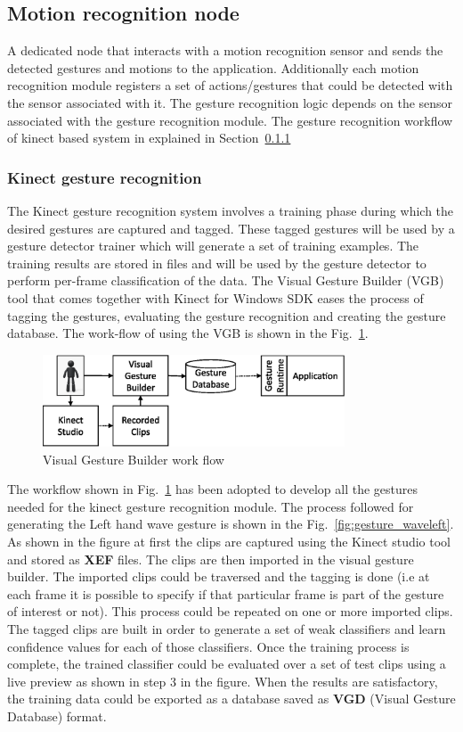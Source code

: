 \subsection{Motion recognition node} A dedicated node that interacts with a motion recognition sensor and sends the detected gestures and motions to the application. Additionally each motion recognition module registers a set of actions/gestures that could be detected with the sensor associated with it. The gesture recognition logic depends on the sensor associated with the gesture recognition module. The gesture recognition workflow of kinect based system in explained in Section~\ref{sssec:kinect_gestures}
\subsubsection{Kinect gesture recognition}
\label{sssec:kinect_gestures}
The Kinect gesture recognition system involves a training phase during which the desired gestures are captured and tagged. These tagged gestures will be used by a gesture detector trainer which will generate a set of training examples. The training results are stored in files and will be used by the gesture detector to perform per-frame classification of the data. The Visual Gesture Builder (VGB) tool that comes together with Kinect for Windows SDK eases the process of tagging the gestures, evaluating the gesture recognition and creating the gesture database. The work-flow of using the VGB is shown in the Fig.~\ref{fig:vgb_workflow}.
\begin{figure}[H]
\centering
\includegraphics[width=0.8\textwidth]{assets/vgb_flow.eps}
\caption[Visual Gesture Builder work flow]{Visual Gesture Builder work flow \cite{KinectSDK2014}}
\label{fig:vgb_workflow}
\end{figure}
The workflow shown in Fig.~\ref{fig:vgb_workflow} has been adopted to develop all the gestures needed for the kinect gesture recognition module. The process followed for generating the Left hand wave gesture is shown in the Fig.~\ref{fig:gesture_waveleft}. As shown in the figure at first the clips are captured using the Kinect studio tool and  stored as \textbf{XEF} files. The clips are then imported in the visual gesture builder. The imported clips could be traversed and the tagging is done (i.e at each frame it is possible to specify if that particular frame is part of the gesture of interest or not). This process could be repeated on one or more imported clips. The tagged clips are built in order to generate a set of weak classifiers and learn confidence values for each of those classifiers. Once the training process is complete, the trained classifier could be evaluated over a set of test clips using a live preview as shown in step 3 in the figure. When the results are satisfactory, the training data could be exported as a database saved as \textbf{VGD} (Visual Gesture Database) format.
